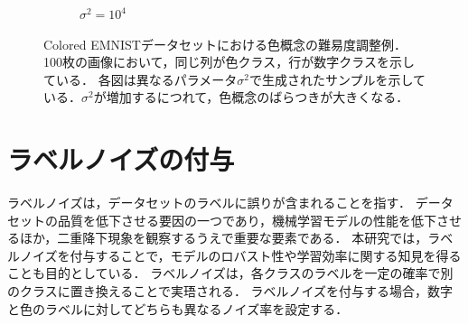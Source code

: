 \begin{figure}[H]
\begin{subfigure}[b]{0.48\textwidth}
        \caption{$\sigma^2 = 10^4$}
        \label{fig:coloredeminst_10000}
    \end{subfigure}
    \caption{Colored EMNISTデータセットにおける色概念の難易度調整例．
    100枚の画像において，同じ列が色クラス，行が数字クラスを示している．
    各図は異なるパラメータ$\sigma^2$で生成されたサンプルを示している．$\sigma^2$が増加するにつれて，色概念のばらつきが大きくなる．
    }
    \label{fig:coloredeminsts}
\end{figure}

\section{ラベルノイズの付与}
ラベルノイズは，データセットのラベルに誤りが含まれることを指す．
データセットの品質を低下させる要因の一つであり，機械学習モデルの性能を低下させるほか，二重降下現象を観察するうえで重要な要素である．
本研究では，ラベルノイズを付与することで，モデルのロバスト性や学習効率に関する知見を得ることも目的としている．
ラベルノイズは，各クラスのラベルを一定の確率で別のクラスに置き換えることで実珸される．
ラベルノイズを付与する場合，数字と色のラベルに対してどちらも異なるノイズ率を設定する．
